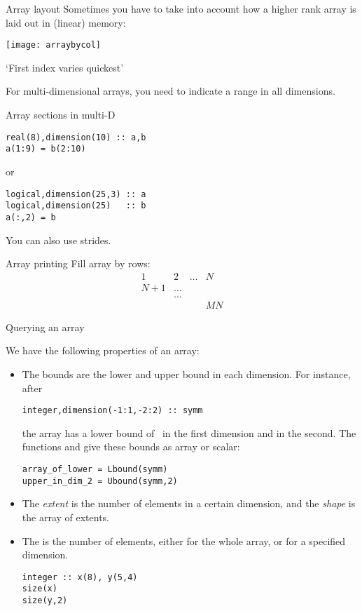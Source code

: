 \begin{block}{Array layout}
  \label{sl:farray-layout}
  Sometimes you have to take into account how a higher rank array
  is laid out in (linear) memory:

  \texttt{[image: arraybycol]}

  `First index varies quickest'
\end{block}

For multi-dimensional arrays, you need to indicate a range in all
dimensions.

\begin{block}{Array sections in multi-D}
  \label{sl:farray-sectiond}
\begin{lstlisting}
real(8),dimension(10) :: a,b
a(1:9) = b(2:10)
\end{lstlisting}
or
\begin{lstlisting}
logical,dimension(25,3) :: a
logical,dimension(25)   :: b
a(:,2) = b
\end{lstlisting}
You can also use strides.
\end{block}

\begin{block}{Array printing}
  \label{sl:farray-print}
  Fill array by rows:
  \[ \begin{matrix}1&2&\ldots&N\\ N+1&\ldots\\ &\ldots\\ &&&MN
  \end{matrix}
  \]
\end{block}

 {Querying an array}

We have the following properties of an array:
\begin{itemize}
\item The bounds are the lower and upper bound in each dimension.
  For instance, after
\begin{lstlisting}
integer,dimension(-1:1,-2:2) :: symm
\end{lstlisting}
the array  has a lower bound of~ in the first dimension
and  in the second. The functions  and
 give these bounds as array or scalar:
\begin{lstlisting}
array_of_lower = Lbound(symm)
upper_in_dim_2 = Ubound(symm,2)
\end{lstlisting}


\item The \emph{extent} is the number
  of elements in a certain dimension, and the
  \emph{shape} is the array of extents.

\item The  is the number of elements, either for
  the whole array, or for a specified dimension.
\begin{lstlisting}
integer :: x(8), y(5,4)
size(x)
size(y,2)
\end{lstlisting}
\end{itemize}

